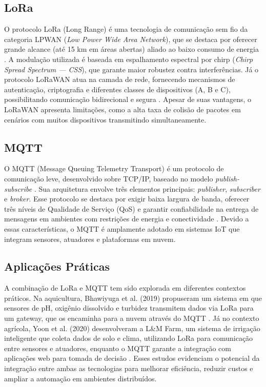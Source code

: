 \documentclass[
article,			%
11pt,				%
twoside,			%
a4paper,			%
section=TITLE,		%
onecolumn,          %
english,			%
brazil,				%
sumario=tradicional
]{abntex2}
\begin{document}
\subsection{LoRa}
O protocolo LoRa (Long Range) é uma tecnologia de comunicação sem fio da categoria LPWAN (\textit{Low Power Wide Area Network}), que se destaca por oferecer grande alcance (até 15 km em áreas abertas) aliado ao baixo consumo de energia \cite{lima2023}. A modulação utilizada é baseada em espalhamento espectral por chirp (\textit{Chirp Spread Spectrum — CSS}), que garante maior robustez contra interferências. Já o protocolo LoRaWAN atua na camada de rede, fornecendo mecanismos de autenticação, criptografia e diferentes classes de dispositivos (A, B e C), possibilitando comunicação bidirecional e segura \cite{huh2019}. Apesar de suas vantagens, o LoRaWAN apresenta limitações, como a alta taxa de colisão de pacotes em cenários com muitos dispositivos transmitindo simultaneamente.

\subsection{MQTT}
O MQTT (Message Queuing Telemetry Transport) é um protocolo de comunicação leve, desenvolvido sobre TCP/IP, baseado no modelo \textit{publish-subscribe} \cite{Yoon2020}. Sua arquitetura envolve três elementos principais: \textit{publisher}, \textit{subscriber} e \textit{broker}. Esse protocolo se destaca por exigir baixa largura de banda, oferecer três níveis de Qualidade de Serviço (QoS) e garantir confiabilidade na entrega de mensagens em ambientes com restrições de energia e conectividade \cite{Bhawiyuga2019}. Devido a essas características, o MQTT é amplamente adotado em sistemas IoT que integram sensores, atuadores e plataformas em nuvem.

\subsection{Aplicações Práticas}
A combinação de LoRa e MQTT tem sido explorada em diferentes contextos práticos. Na aquicultura, Bhawiyuga et al. (2019) propuseram um sistema em que sensores de pH, oxigênio dissolvido e turbidez transmitem dados via LoRa para um gateway, que os encaminha para a nuvem através do MQTT \cite{Bhawiyuga2019}. Já no contexto agrícola, Yoon et al. (2020) desenvolveram a L\&M Farm, um sistema de irrigação inteligente que coleta dados de solo e clima, utilizando LoRa para comunicação entre sensores e atuadores, enquanto o MQTT garante a integração com aplicações web para tomada de decisão \cite{Yoon2020}. Esses estudos evidenciam o potencial da integração entre ambas as tecnologias para melhorar eficiência, reduzir custos e ampliar a automação em ambientes distribuídos.
\end{document}
